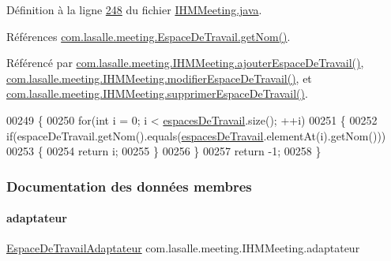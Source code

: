 Définition à la ligne \hyperlink{_i_h_m_meeting_8java_source_l00248}{248} du fichier \hyperlink{_i_h_m_meeting_8java_source}{I\+H\+M\+Meeting.\+java}.



Références \hyperlink{_espace_de_travail_8java_source_l00087}{com.\+lasalle.\+meeting.\+Espace\+De\+Travail.\+get\+Nom()}.



Référencé par \hyperlink{_i_h_m_meeting_8java_source_l00199}{com.\+lasalle.\+meeting.\+I\+H\+M\+Meeting.\+ajouter\+Espace\+De\+Travail()}, \hyperlink{_i_h_m_meeting_8java_source_l00214}{com.\+lasalle.\+meeting.\+I\+H\+M\+Meeting.\+modifier\+Espace\+De\+Travail()}, et \hyperlink{_i_h_m_meeting_8java_source_l00232}{com.\+lasalle.\+meeting.\+I\+H\+M\+Meeting.\+supprimer\+Espace\+De\+Travail()}.


\begin{DoxyCode}
00249     \{
00250         \textcolor{keywordflow}{for}(\textcolor{keywordtype}{int} i = 0; i < \hyperlink{classcom_1_1lasalle_1_1meeting_1_1_i_h_m_meeting_acba41978aec60c27f07db774f9b68b68}{espacesDeTravail}.size(); ++i)
00251         \{
00252             \textcolor{keywordflow}{if}(espaceDeTravail.getNom().equals(\hyperlink{classcom_1_1lasalle_1_1meeting_1_1_i_h_m_meeting_acba41978aec60c27f07db774f9b68b68}{espacesDeTravail}.elementAt(i).getNom()))
00253             \{
00254                 \textcolor{keywordflow}{return} i;
00255             \}
00256         \}
00257         \textcolor{keywordflow}{return} -1;
00258     \}
\end{DoxyCode}


\subsubsection{Documentation des données membres}
\mbox{\label{classcom_1_1lasalle_1_1meeting_1_1_i_h_m_meeting_ac103010077163ba43b830ffe524f476d}} 
\paragraph{\texorpdfstring{adaptateur}{adaptateur}}
{\footnotesize\ttfamily \hyperlink{classcom_1_1lasalle_1_1meeting_1_1_espace_de_travail_adaptateur}{Espace\+De\+Travail\+Adaptateur} com.\+lasalle.\+meeting.\+I\+H\+M\+Meeting.\+adaptateur\hspace{0.3cm}{\ttfamily [private]}}



